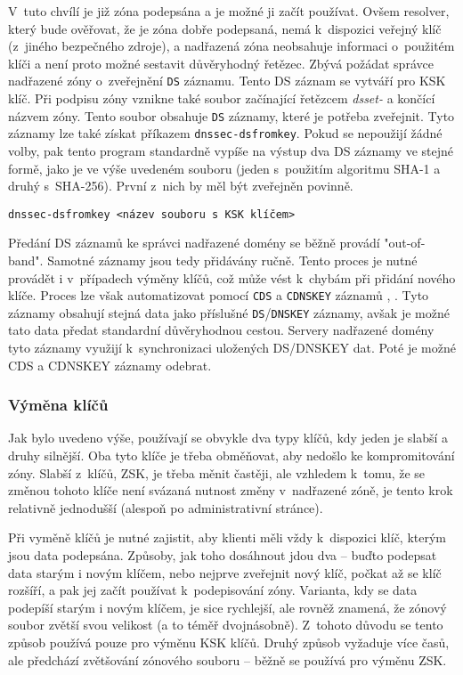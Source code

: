 V~tuto chvílí je již zóna podepsána a je možné ji začít používat. Ovšem resolver, který bude ověřovat, že je zóna dobře podepsaná, nemá k~dispozici veřejný klíč (z~jiného bezpečného zdroje), a nadřazená zóna neobsahuje informaci o~použitém klíči a není proto možné sestavit důvěryhodný řetězec. Zbývá požádat správce nadřazené zóny o~zveřejnění {\tt DS} záznamu. Tento DS záznam se vytváří pro KSK klíč. Při podpisu zóny vznikne také soubor začínající řetězcem {\em dsset-} a končící názvem zóny. Tento soubor obsahuje {\tt DS} záznamy, které je potřeba zveřejnit. Tyto záznamy lze také získat příkazem {\tt dnssec-dsfromkey}. Pokud se nepoužijí žádné volby, pak tento program standardně vypíše na výstup dva DS záznamy ve stejné formě, jako je ve výše uvedeném souboru (jeden s~použitím algoritmu SHA-1 a druhý s~SHA-256). První z~nich by měl být zveřejněn povinně.
\begin{verbatim}
dnssec-dsfromkey <název souboru s KSK klíčem>
\end{verbatim}
Předání DS záznamů ke správci nadřazené domény se běžně provádí "out-of-band". Samotné záznamy jsou tedy přidávány ručně. Tento proces je nutné provádět i v~případech výměny klíčů, což může vést k~chybám při přidání nového klíče. Proces lze však automatizovat 
pomocí {\tt CDS} a {\tt CDNSKEY} záznamů \cite{rfc7344}, \cite{rfc8078}. Tyto záznamy obsahují stejná data jako příslušné {\tt DS}/{\tt DNSKEY} záznamy, avšak je možné tato data předat standardní důvěryhodnou cestou. Servery nadřazené domény tyto záznamy využijí k~synchronizaci uložených DS/DNSKEY dat. Poté je možné CDS a CDNSKEY záznamy odebrat.

\subsubsection*{Výměna klíčů}
Jak bylo uvedeno výše, používají se obvykle dva typy klíčů, kdy jeden je slabší a druhy silnější. Oba tyto klíče je třeba obměňovat, aby nedošlo ke kompromitování zóny. Slabší z~klíčů, ZSK, je třeba měnit častěji, ale vzhledem k~tomu, že se změnou tohoto klíče není svázaná nutnost změny v~nadřazené zóně, je tento krok relativně jednodušší (alespoň po administrativní stránce).

Při vyměně klíčů je nutné zajistit, aby klienti měli vždy k~dispozici klíč, kterým jsou data podepsána. Způsoby, jak toho dosáhnout jdou dva -- buďto podepsat data starým i novým klíčem, nebo nejprve zveřejnit nový klíč, počkat až se klíč rozšíří, a pak jej začít používat k~podepisování zóny. Varianta, kdy se data podepíší starým i novým klíčem, je sice rychlejší, ale rovněž znamená, že zónový soubor zvětší svou velikost (a to téměř dvojnásobně). Z~tohoto důvodu se tento způsob používá pouze pro výměnu KSK klíčů. Druhý způsob vyžaduje více časů, ale předchází zvětšování zónového souboru -- běžně se používá pro výměnu ZSK.

